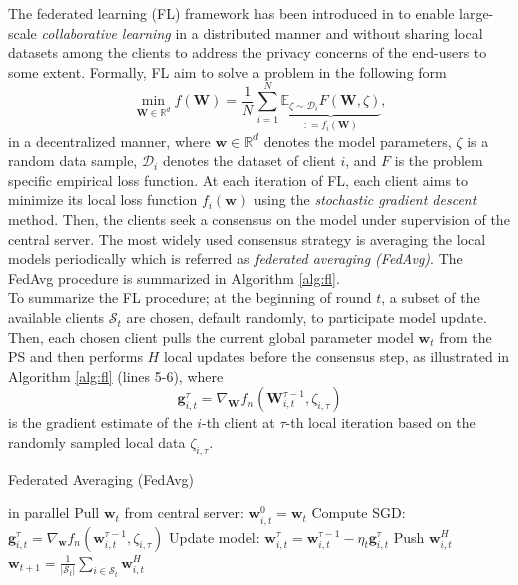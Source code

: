 \documentclass[journal]{IEEEtran}
\begin{document}
The federated learning (FL) framework has been introduced in \cite{FL1} to enable large-scale {\em collaborative learning} in a distributed manner and without sharing local datasets among the clients to address the privacy concerns of the end-users to some extent. Formally, FL aim to solve a problem in the following form
\begin{equation}
\min_{\boldsymbol{\boldsymbol{W}}\in\mathbb{R}^{d}} f(\boldsymbol{W})= \frac{1}{N}\sum^{N}_{i=1}\underbrace{\mathds{E}_{\zeta \sim \mathcal{D}_{i}}F(\boldsymbol{W},\zeta)}_{\mathrel{\mathop:}=f_{i}(\boldsymbol{W})},\label{DSO}
\end{equation}
in a decentralized manner, where $\boldsymbol{w}\in\mathbb{R}^{d}$ denotes the model parameters,  $\zeta$ is a random data sample, $\mathcal{D}_{i}$ denotes the dataset of client $i$, and $F$ is the problem specific empirical loss function. At each iteration of FL,  each client aims to minimize its local loss function $f_{i}(\boldsymbol{w})$ using the {\em stochastic gradient descent} method. Then, the clients seek a consensus on the model under supervision of the central server. The most widely used consensus strategy is averaging the local models periodically which is referred as {\em federated averaging (FedAvg)}. The FedAvg procedure is summarized in Algorithm \ref{alg:fl}.\\
\indent To summarize the FL procedure; at the beginning of round $t$, a subset of the available clients $\mathcal{S}_{t}$ are chosen, default randomly, to participate model update. Then, each chosen client pulls the current global parameter model $\boldsymbol{w}_t$ from the PS and then performs $H$ local updates before the consensus step, as illustrated in Algorithm \ref{alg:fl} (lines 5-6), where 
\begin{equation}
\mathbf{g}^{\tau}_{i,t}=\nabla_{\boldsymbol{W}}f_{n}(\boldsymbol{W}^{\tau-1}_{i,t},\zeta_{i,\tau})
\end{equation}
is the gradient estimate of the $i$-th client at $\tau$-th local iteration based on the randomly sampled local data $\zeta_{i,\tau}$.

\begin{algorithm}[t!]
\caption{Federated Averaging (FedAvg) }\label{alg:fl}
\begin{algorithmic}[1]
     in parallel
        \State Pull $\boldsymbol{w}_{t}$ from central server: $\boldsymbol{w}^{0}_{i,t}=\boldsymbol{w}_{t}$
            \State Compute SGD: $\mathbf{g}^{\tau}_{i,t}=\nabla_{\boldsymbol{w}}f_{n}(\boldsymbol{w}^{\tau-1}_{i,t},\zeta_{i,\tau})$
            \State Update model: $\boldsymbol{w}^{\tau}_{i,t}=\boldsymbol{w}^{\tau-1}_{i,t}-\eta_{t}\mathbf{g}^{\tau}_{i,t}$
       \EndFor
       \State Push $\boldsymbol{w}^{H}_{i,t}$
    \EndFor
     $\boldsymbol{w}_{t+1}=\frac{1}{ \vert \mathcal{S}_{t} \vert}\sum_{i\in\mathcal{S}_{t}} \boldsymbol{w}^{H}_{i,t}$
\EndFor
\end{algorithmic}
\end{algorithm}
\end{document}
